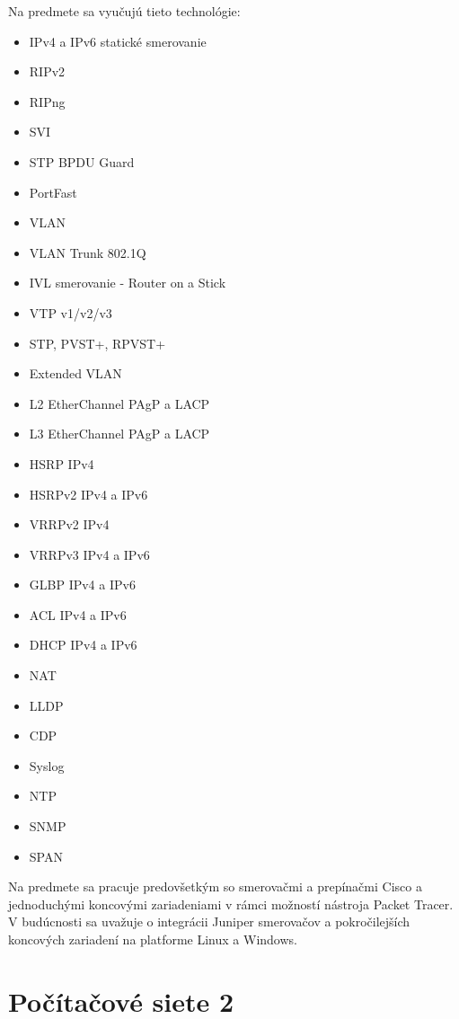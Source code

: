 Na predmete sa vyučujú tieto technológie:

\begin{itemize}
    \item IPv4 a IPv6 statické smerovanie
    \item RIPv2
    \item RIPng
    \item SVI
    \item STP BPDU Guard
    \item PortFast
    \item VLAN
    \item VLAN Trunk 802.1Q
    \item IVL smerovanie - Router on a Stick
    \item VTP v1/v2/v3
    \item STP, PVST+, RPVST+
    \item Extended VLAN
    \item L2 EtherChannel PAgP a LACP
    \item L3 EtherChannel PAgP a LACP
    \item HSRP IPv4 
    \item HSRPv2 IPv4 a IPv6 
    \item VRRPv2 IPv4 
    \item VRRPv3 IPv4 a IPv6 
    \item GLBP IPv4 a IPv6 
    \item ACL IPv4 a IPv6 
    \item DHCP IPv4 a IPv6 
    \item NAT
    \item LLDP
    \item CDP
    \item Syslog
    \item NTP
    \item SNMP
    \item SPAN
\end{itemize}

Na predmete sa pracuje predovšetkým so smerovačmi a prepínačmi Cisco a jednoduchými koncovými zariadeniami v rámci možností nástroja Packet Tracer. V budúcnosti sa uvažuje o integrácii Juniper smerovačov a pokročilejších koncových zariadení na platforme Linux a Windows.




\section{Počítačové siete 2}


